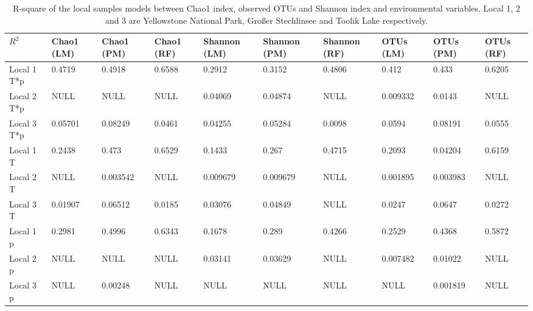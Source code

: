 \begin{table}[H]
    \caption{R-square of the local samples models between Chao1 index, observed OTUs and Shannon index and environmental variables. Local 1, 2 and 3 are Yellowstone National Park, Großer Stechlinsee and Toolik Lake respectively.}
    \centering
    \begin{tabular}{ |m{1.3cm}<{\centering}|m{1.2cm}<{\centering}|m{1.2cm}<{\centering}|m{1.2cm}<{\centering}|m{1.4cm}<{\centering}|m{1.4cm}<{\centering}|m{1.4cm}<{\centering}|m{1.3cm}<{\centering}|m{1.3cm}<{\centering}|m{1.2cm}<{\centering}|} 
    \hline
     $R^{2}$ & Chao1 (LM) & Chao1 (PM) & Chao1 (RF) & Shannon (LM) & Shannon (PM) & Shannon (RF) & OTUs (LM) & OTUs (PM) & OTUs (RF) \\
     \hline
    Local 1 T*p & 0.4719 & 0.4918 & 0.6588 & 0.2912 & 0.3152 & 0.4806 & 0.412 & 0.433 & 0.6205 \\
    Local 2 T*p & NULL & NULL & NULL & 0.04069 & 0.04874 & NULL & 0.009332 & 0.0143 & NULL \\
    Local 3 T*p & 0.05701 & 0.08249 & 0.0461 & 0.04255 & 0.05284 & 0.0098 & 0.0594 & 0.08191 & 0.0555 \\
    Local 1 T & 0.2438 & 0.473 & 0.6529 & 0.1433 & 0.267 & 0.4715 & 0.2093 & 0.04204 & 0.6159 \\
    Local 2 T & NULL & 0.003542 & NULL & 0.009679 & 0.009679 & NULL & 0.001895 & 0.003983 & NULL \\
    Local 3 T & 0.01907 & 0.06512 & 0.0185 & 0.03076 & 0.04849 & NULL & 0.0247 & 0.0647 & 0.0272 \\
    Local 1 p & 0.2981 & 0.4996 & 0.6343 & 0.1678 & 0.289 & 0.4266 & 0.2529 & 0.4368 & 0.5872 \\
    Local 2 p & NULL & NULL & NULL & 0.03141 & 0.03629 & NULL & 0.007482 & 0.01022 & NULL \\
    Local 3 p & NULL & 0.00248 & NULL & NULL & NULL & NULL & NULL & 0.001819 & NULL \\
    \hline
    \end{tabular}    
    \label{tab:localmodels}
\end{table}

